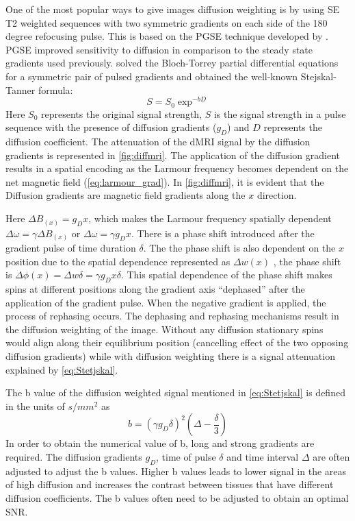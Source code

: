 \documentclass[msthesis.tex]{subfiles}
\begin{document}
One of the most popular ways to give images diffusion weighting is by using \gls{SE} T2 weighted sequences with two symmetric gradients on each side of the 180 degree refocusing pulse. This is based on the \gls{PGSE} technique developed by \cite{stejskal1965spin}. \Gls{PGSE} improved sensitivity to diffusion in comparison to the steady state gradients used previously. \cite{stejskal1965spin} solved the Bloch-Torrey partial differential equations for a symmetric pair of pulsed gradients \citep{bloch1946nuclear} and obtained the well-known Stejskal-Tanner formula:
\begin{equation}
\label{eq:Stetjskal}
S = S_0 \exp^{-bD}
\end{equation}
Here $S_0$ represents the original signal strength, $S$ is the signal strength in a pulse sequence with the presence of diffusion gradients ($g_D$) and $D$ represents the diffusion coefficient. The attenuation of the \gls{dMRI} signal by the diffusion gradients is represented in \cref{fig:diffmri}. The application of the diffusion gradient results in a spatial encoding as the Larmour frequency becomes dependent on the net magnetic field (\cref{eq:larmour_grad}). In \cref{fig:diffmri}, it is evident that the Diffusion gradients are magnetic field gradients along the $x$ direction. 

Here $\Delta B_(x) = g_D x$, which makes the Larmour frequency spatially dependent $\Delta \omega = \gamma \Delta B_(x)$ or $\Delta \omega = \gamma g_D x$. There is a phase shift introduced after the gradient pulse of time duration $\delta$. The the phase shift is also dependent on the $x$ position due to the spatial dependence represented as $\Delta w(x)$ , the phase shift is $\Delta \phi (x) = \Delta w \delta = \gamma g_D x \delta$. This spatial dependence of the phase shift makes spins at different positions along the gradient axis ``dephased'' after the application of the gradient pulse. When the negative gradient is applied, the process of rephasing occurs. The dephasing and rephasing mechanisms result in the diffusion weighting of the image. Without any diffusion stationary spins would align along their equilibrium position (cancelling effect of the two opposing diffusion gradients) while with diffusion weighting there is a signal attenuation explained by \cref{eq:Stetjskal}. 

The b value of the diffusion weighted signal mentioned in \cref{eq:Stetjskal} is defined in the units of $s/mm^2$ as
\begin{equation}
    b = (\gamma g_D \delta)^2 (\Delta - \frac{\delta}{3})
\end{equation}
In order to obtain the numerical value of b, long and strong gradients are required. The diffusion gradients $g_D$, time of pulse $\delta$ and time interval $\Delta$ are often adjusted to adjust the b values. Higher b values leads to lower signal in the areas of high diffusion and increases the contrast between tissues that have different diffusion coefficients. The b values often need to be adjusted to obtain an optimal \gls{SNR}.
\end{document}

